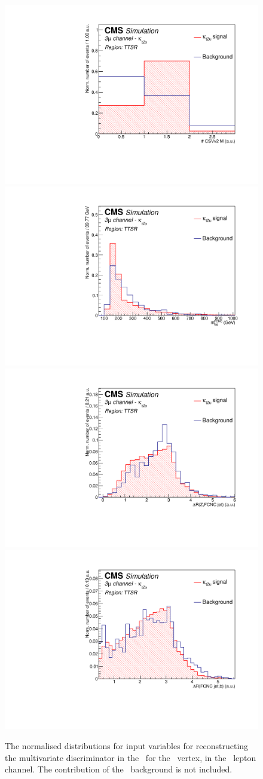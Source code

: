 \begin{figure}[htbp]
	\includegraphics[width=0.3\linewidth]{6_Search/Figures/PlotsTechnics/NJets_CSVv2MZuttoppairuuu_norm}
	\includegraphics[width=0.3\linewidth]{6_Search/Figures/PlotsTechnics/FCNCtop_MZuttoppairuuu_norm}
	\includegraphics[width=0.3\linewidth]{6_Search/Figures/PlotsTechnics/dRZcZuttoppairuuu_norm}
	\includegraphics[width=0.3\linewidth]{6_Search/Figures/PlotsTechnics/dRSMjetLightjetZuttoppairuuu_norm}
	\caption{The normalised distributions for input variables for reconstructing the multivariate discriminator in the \TTSR\ for the \Zut\ vertex, in the \mumumu\ lepton channel. The contribution of the \NPL\ background is not included.}
	\label{fig:toppairZutnormalized}
\end{figure}

